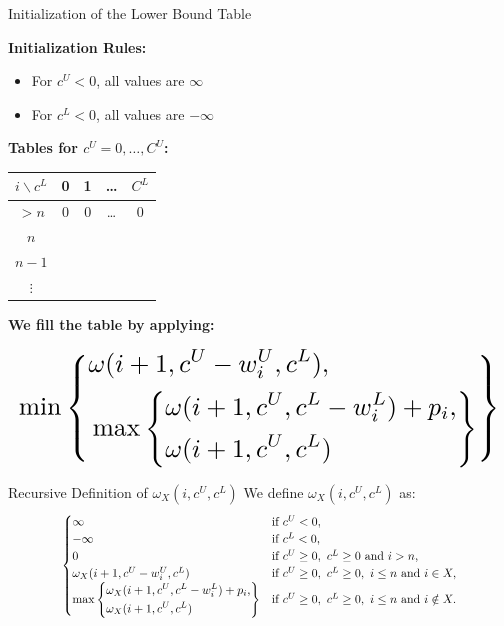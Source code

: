 \documentclass[fleqn,11pt,aspectratio=43]{beamer}
\begin{document}
\begin{frame}[fragile]{Initialization of the Lower Bound Table}

\textbf{Initialization Rules:}
\begin{itemize}
    \item For $c^U < 0$, all values are $\infty$
    \item For $c^L < 0$, all values are $- \infty$
\end{itemize}

\vspace{0.5em}

\begin{minipage}{0.45\textwidth}
\textbf{Tables for $c^U = 0, \dotsc, C^U$:}

\renewcommand{\arraystretch}{1.2}
\begin{tabular}{c|cccc}
$i \backslash c^L$ & 0 & 1 & \dots & $C^L$ \\
\hline
$>n$ & 0 & 0 & \dots & 0 \\
$n$ &   &   &       &   \\
$n-1$ &   &   &       &   \\
$\vdots$ &   &   &       &   
\end{tabular}
\end{minipage}
\hfill
\begin{minipage}{0.5\textwidth}
\vspace{0.99em} %
\textbf{We fill the table by applying:}

\[
\resizebox{\linewidth}{!}{$
\min \left\{
\begin{aligned}
&\omega(i + 1, c^U - w_i^U, c^L), \\
&\max \left\{
\begin{aligned}
&\omega(i + 1, c^U, c^L - w_i^L) + p_i, \\
&\omega(i + 1, c^U, c^L)
\end{aligned}
\right\}
\end{aligned}
\right\}
$}
\]
\end{minipage}
\end{frame}







\begin{frame}{Recursive Definition of $\omega_X(i, c^U, c^L)$}
We define $\omega_X(i, c^U, c^L)$ as:
\[
\scalebox{0.85}{$
\begin{cases}
\infty & \text{if } c^U < 0, \\
-\infty & \text{if } c^L < 0, \\
0 & \text{if } c^U \geq 0,\ c^L \geq 0 \text{ and } i > n, \\
\omega_X(i+1, c^U - w_i^U, c^L) & \text{if } c^U \geq 0,\ c^L \geq 0,\ i \leq n \text{ and } i \in X, \\
\max\left\{
\begin{aligned}
&\omega_X(i+1, c^U, c^L - w_i^L) + p_i, \\
&\omega_X(i+1, c^U, c^L)
\end{aligned}
\right\} & \text{if } c^U \geq 0,\ c^L \geq 0,\ i \leq n \text{ and } i \notin X.
\end{cases}
$}
\]
\end{frame}
\end{document}
